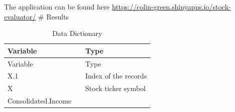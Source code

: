\documentclass[11pt,]{article}
\begin{document}
The application can be found here
\url{https://colin-green.shinyapps.io/stock-evaluator/} \# Results

\begin{longtable}[]{@{}lll@{}}
\caption{Data Dictionary}\tabularnewline
\toprule
\begin{minipage}[b]{0.19\columnwidth}\raggedright
Variable\strut
\end{minipage} & \begin{minipage}[b]{0.10\columnwidth}\raggedright
\strut
\end{minipage} & \begin{minipage}[b]{0.62\columnwidth}\raggedright
Type\strut
\end{minipage}\tabularnewline
\midrule
\endfirsthead
\toprule
\begin{minipage}[b]{0.19\columnwidth}\raggedright
Variable\strut
\end{minipage} & \begin{minipage}[b]{0.10\columnwidth}\raggedright
\strut
\end{minipage} & \begin{minipage}[b]{0.62\columnwidth}\raggedright
Type\strut
\end{minipage}\tabularnewline
\midrule
\endhead
\begin{minipage}[t]{0.19\columnwidth}\raggedright
X.1\strut
\end{minipage} & \begin{minipage}[t]{0.10\columnwidth}\raggedright
\strut
\end{minipage} & \begin{minipage}[t]{0.62\columnwidth}\raggedright
Index of the records\strut
\end{minipage}\tabularnewline
\begin{minipage}[t]{0.19\columnwidth}\raggedright
X\strut
\end{minipage} & \begin{minipage}[t]{0.10\columnwidth}\raggedright
\strut
\end{minipage} & \begin{minipage}[t]{0.62\columnwidth}\raggedright
Stock ticker symbol\strut
\end{minipage}\tabularnewline
\begin{minipage}[t]{0.19\columnwidth}\raggedright
Consolidated.Income\strut
\end{minipage} & \begin{minipage}[t]{0.10\columnwidth}\raggedright
\strut
\end{minipage} & \begin{minipage}[t]{0.62\columnwidth}\raggedright

\end{minipage}
\end{longtable}
\end{document}
